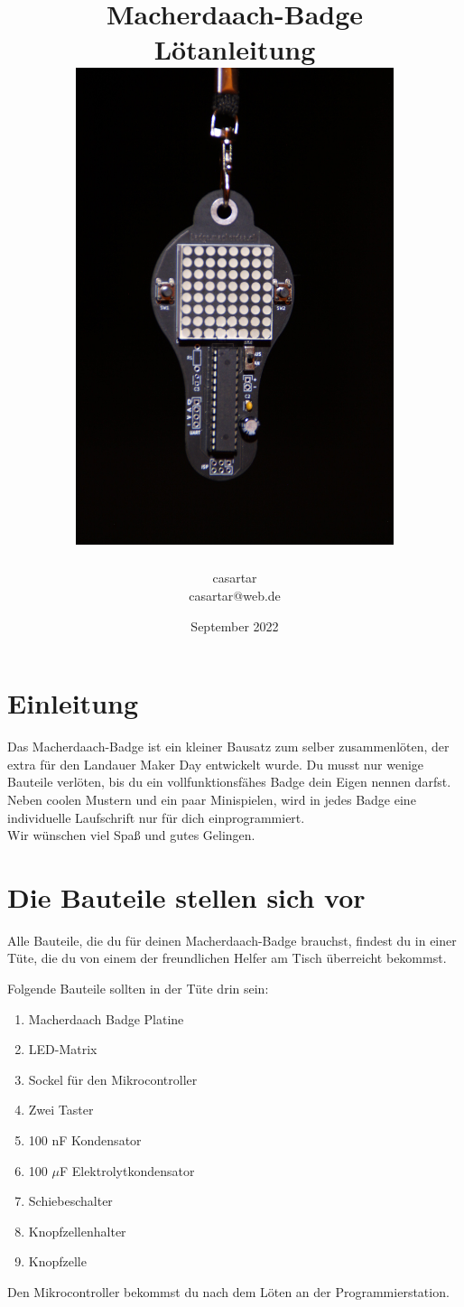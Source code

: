 \documentclass{article}
\title{Macherdaach-Badge \\ Lötanleitung \\ [1cm]
\includegraphics[width=0.7\textwidth, angle=90]{Bilder2022/IMG_8263.JPG}
}
\date{September 2022}
\author{casartar\\casartar@web.de}
\begin{document}
\maketitle
\newpage
\section{Einleitung}

Das Macherdaach-Badge ist ein kleiner Bausatz zum selber zusammenlöten, der extra für den Landauer Maker Day entwickelt wurde.
Du musst nur wenige Bauteile verlöten, bis du ein vollfunktionsfähes Badge dein Eigen nennen darfst. Neben coolen Mustern und ein paar Minispielen, wird in jedes Badge eine individuelle Laufschrift nur für dich einprogrammiert.\\

Wir wünschen viel Spaß und gutes Gelingen. 

\section{Die Bauteile stellen sich vor}
Alle Bauteile, die du für deinen Macherdaach-Badge brauchst, findest du in einer Tüte, die du von einem der freundlichen Helfer am Tisch überreicht bekommst.

Folgende Bauteile sollten in der Tüte drin sein:

\begin{enumerate}
	\item Macherdaach Badge Platine
	\item LED-Matrix
	\item Sockel für den Mikrocontroller
	\item Zwei Taster
	\item 100 nF Kondensator
	\item 100 $\mu$F Elektrolytkondensator
	\item Schiebeschalter
	\item Knopfzellenhalter
	\item Knopfzelle
\end{enumerate}

Den Mikrocontroller bekommst du nach dem Löten an der Programmierstation.

\newpage
\end{document}
